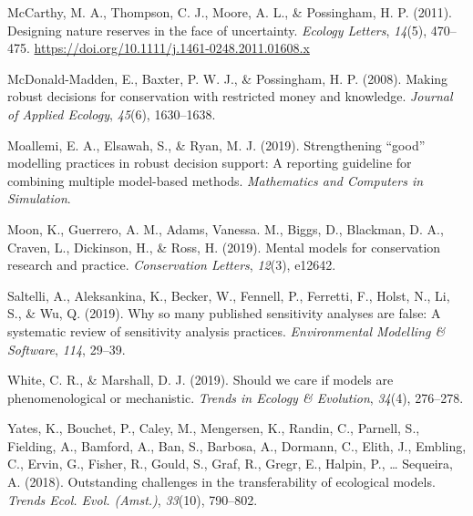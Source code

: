 \documentclass[
]{article}
\newlength{\cslhangindent}
\newenvironment{CSLReferences}[2] %
 {\begin{list}{}{%
  \setlength{\itemindent}{0pt}
  \setlength{\leftmargin}{0pt}
  \setlength{\parsep}{0pt}
  \ifodd #1
   \setlength{\leftmargin}{\cslhangindent}
   \setlength{\itemindent}{-1\cslhangindent}
  \fi
  \setlength{\itemsep}{#2\baselineskip}}}
 {\end{list}}
\begin{document}
\begin{CSLReferences}{1}{0}
McCarthy, M. A., Thompson, C. J., Moore, A. L., \& Possingham, H. P.
(2011). Designing nature reserves in the face of uncertainty.
\emph{Ecology Letters}, \emph{14}(5), 470--475.
\url{https://doi.org/10.1111/j.1461-0248.2011.01608.x}

McDonald-Madden, E., Baxter, P. W. J., \& Possingham, H. P. (2008).
Making robust decisions for conservation with restricted money and
knowledge. \emph{Journal of Applied Ecology}, \emph{45}(6), 1630--1638.

Moallemi, E. A., Elsawah, S., \& Ryan, M. J. (2019). Strengthening
{``good''} modelling practices in robust decision support: A reporting
guideline for combining multiple model-based methods. \emph{Mathematics
and Computers in Simulation}.

Moon, K., Guerrero, A. M., Adams, Vanessa. M., Biggs, D., Blackman, D.
A., Craven, L., Dickinson, H., \& Ross, H. (2019). Mental models for
conservation research and practice. \emph{Conservation Letters},
\emph{12}(3), e12642.

Saltelli, A., Aleksankina, K., Becker, W., Fennell, P., Ferretti, F.,
Holst, N., Li, S., \& Wu, Q. (2019). Why so many published sensitivity
analyses are false: A systematic review of sensitivity analysis
practices. \emph{Environmental Modelling \& Software}, \emph{114},
29--39.

White, C. R., \& Marshall, D. J. (2019). Should we care if models are
phenomenological or mechanistic. \emph{Trends in Ecology \& Evolution},
\emph{34}(4), 276--278.

Yates, K., Bouchet, P., Caley, M., Mengersen, K., Randin, C., Parnell,
S., Fielding, A., Bamford, A., Ban, S., Barbosa, A., Dormann, C., Elith,
J., Embling, C., Ervin, G., Fisher, R., Gould, S., Graf, R., Gregr, E.,
Halpin, P., \ldots{} Sequeira, A. (2018). Outstanding challenges in the
transferability of ecological models. \emph{Trends Ecol. Evol. (Amst.)},
\emph{33}(10), 790--802.

\end{CSLReferences}
\end{document}
